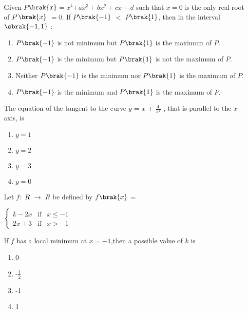 \documentclass[journal,12pt,onecolumn]{IEEEtran}
\theoremstyle{remark}
\begin{document}
            
        \item Given $P$$\brak{x}$$=$$x^4$$+$$ ax^3+bx^2+cx+d$ such that $x = 0$ is the only real root of $P$$^\prime$$\brak{x}$ $=$$0$. If $P$$\brak{-1}$ $<$ $P$$\brak{1}$, then in the interval $\sbrak{-1,1}$ $\colon$ \hfill{}
        
        \begin{enumerate}
        
            
        
            
        \item $P\brak{-1}$ is not minimum but $P\brak{1}$ is the maximum of $P$. 
        \item $P\brak{-1}$ is the minimum but $P\brak{1}$ is not the maximum of $P$. 
        \item  Neither $P\brak{-1}$ is the  minimum nor  $P\brak{1}$ is the maximum of $P$. 
        \item $P\brak{-1}$ is the minimum and $P\brak{1}$ is the maximum of $P$. 
        
        \end{enumerate}
        
            
        \item The equation of the tangent to the curve $y$ = $x$ + $\frac{4}{x^2}$ , that is parallel to the $x$-axis, is\hfill{}
         \begin{multicols}{4}
        \begin{enumerate}
        
            
        
            \item $y=1$
        \item $y=2$
        \item $y=3$
        \item $y=0$
        \end{enumerate}
        \end{multicols}
            
        \item Let $f$$\colon$ $R$ $\to$ $R$ be defined by $f\brak{x}$ = 
    
 $\left\{ \begin{array}{rcl}
     k-2x & \text{if} &  x\leq -1 \\ 2x+3 & \text{if} & x>-1
     \end{array}\right.$
        
        
        If $f$ has a local minimum at $x = -1$,then a possible value of $k$ is\hfill{}
         \begin{multicols}{4}
        
        
        \begin{enumerate}
        
            
        
        \item 0
        \item -$\frac{1}{2}$
        \item -1
        \item 1
        
        \end{enumerate}
        \end{multicols}
            
\end{document}

